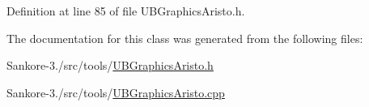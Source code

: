 Definition at line 85 of file U\-B\-Graphics\-Aristo.\-h.



The documentation for this class was generated from the following files\-:\begin{DoxyCompactItemize}
\item 
Sankore-\/3./src/tools/\hyperlink{_u_b_graphics_aristo_8h}{U\-B\-Graphics\-Aristo.\-h}\item 
Sankore-\/3./src/tools/\hyperlink{_u_b_graphics_aristo_8cpp}{U\-B\-Graphics\-Aristo.\-cpp}\end{DoxyCompactItemize}
